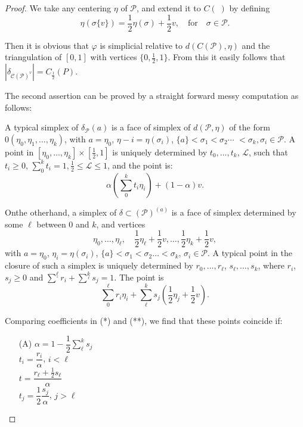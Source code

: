\begin{proof}
We take any centering $\eta$ of $\mathscr{P}$, and extend it to $C(\;)$ by defining
$$
\eta(\sigma\{v\})=\frac{1}{2}\eta(\sigma)+\frac{1}{2}v,\quad\text{for}\quad \sigma\in\mathscr{P}.
$$

Then it is obvious that $\varphi$ is simplicial relative to $d(C(\mathscr{P}),\eta)$ and the triangulation of $[0,1]$ with vertices $\{0,\frac{1}{2},1\}$. From this it easily follows that $|\delta_{\mathscr{C}(\mathscr{P})^{v}}|=C_{\frac{1}{2}}(P)$. 

The second assertion can be proved by a straight forward messy computation as follows:

A typical simplex of $\delta_{\mathscr{P}}(a)$ is a face of simplex of $d(\mathscr{P},\eta)$ of the form $0(\eta_{0},\eta_{1},\ldots,\eta_{k})$, with $a=\eta_{0}$, $\eta-{i}=\eta(\sigma_{i})$, $\{a\}<\sigma_{1}<\sigma_{2}\cdots$ $<\sigma_{k},\sigma_{i}\in\mathscr{P}$. A point in $[\eta_{0},\ldots,\eta_{k}]\times [\frac{1}{2},1]$ is uniquely determined by $t_{0},\ldots,t_{k}$, $\mathcal{L}$, such that $t_{i}\geq 0$, $\sum^{k}_{0} t_i=1,\frac{1}{2}\leq\mathcal{L}\leq 1$, and the point is:
\begin{equation*}
\alpha(\sum^{k}_{0}t_{i}\eta_{i})+(1-\alpha)v.\tag{*}
\end{equation*}

On\pageoriginale the otherhand, a simplex of $\delta\subset (\mathscr{P})^{(a)}$ is a face of simplex determined by some $\ell$ between $0$ and $k$, and vertices
$$
\eta_{0},\ldots,\eta_{\ell},\quad \frac{1}{2}\eta_{\ell}+\frac{1}{2}v,\ldots,\frac{1}{2}\eta_{k}+\frac{1}{2}v,
$$
with $a=\eta_{0}$, $\eta_{i}=\eta(\sigma_{i})$, $\{a\}<\sigma_{1}<\sigma_{2}\ldots <\sigma_{k}$, $\sigma_{i}\in \mathscr{P}$. A typical point in the closure of such a simplex is uniquely determined by $r_{0},\ldots,r_{\ell}$, $s_{\ell},\ldots,s_{k}$, where $r_{i}$, $s_{j}\geq 0$ and $\sum^{\ell}\limits_{\circ}r_{i}+\sum^{k}\limits_{\ell}s_{j}=1$. The point is
\begin{equation*}
\sum^{\ell}_{0}r_{i}\eta_{i}+\sum^{k}_{\ell}s_{j}(\frac{1}{2}\eta_{j}+\frac{1}{2}v).\tag{**}
\end{equation*}

Comparing coefficients in (*) and (**), we find that these points coincide if:
\begin{itemize}
\item[(A)] $\alpha=1-\dfrac{1}{2}\sum^{k}_{\ell}s_{j}$\\[4pt]
$t_{i}=\dfrac{r_{i}}{\alpha}$, $i<\ell$\\[4pt]
$t=\dfrac{r_{\ell}+\frac{1}{2}s_{\ell}}{\alpha}$\\[4pt]
$t_{j}=\dfrac{1}{2}\dfrac{s_{j}}{\alpha}$, $j>\ell$


\end{itemize}
\end{proof}
